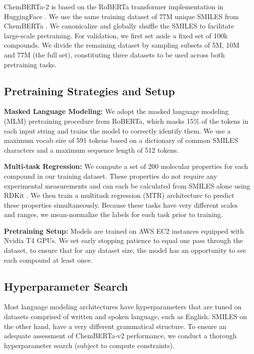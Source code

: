 \documentclass{article}
\begin{document}
ChemBERTa-2 is based on the RoBERTa \cite{roberta} transformer implementation in HuggingFace \cite{huggingface}. We use the same training dataset of 77M unique SMILES from ChemBERTa \cite{chithrananda2020chemberta}. We canonicalize and globally shuffle the SMILES to facilitate large-scale pretraining. For validation, we first set aside a fixed set of 100k compounds. We divide the remaining dataset by sampling subsets of 5M, 10M and 77M (the full set), constituting three datasets to be used across both pretraining tasks.



\subsection{Pretraining Strategies and Setup}

\textbf{Masked Language Modeling:} We adopt the masked language modeling (MLM) pretraining procedure from RoBERTa, which masks 15\% of the tokens in each input string and trains the model to correctly identify them. We use a maximum vocab size of 591 tokens based on a dictionary of common SMILES characters and a maximum sequence length of 512 tokens.

\textbf{Multi-task Regression:} We compute a set of 200 molecular properties for each compound in our training dataset. These properties do not require any experimental measurements and can each be calculated from SMILES alone using RDKit \cite{rdkit}. We then train a multitask regression (MTR) architecture to predict these properties simultaneously. Because these tasks have very different scales and ranges, we mean-normalize the labels for each task prior to training.

\textbf{Pretraining Setup:} Models are trained on AWS EC2 instances equipped with Nvidia T4 GPUs. We set early stopping patience to equal one pass through the dataset, to ensure that for any dataset size, the model has an opportunity to see each compound at least once. 

\subsection{Hyperparameter Search}

Most language modeling architectures have hyperparameters that are tuned on datasets comprised of written and spoken language, such as English. SMILES on the other hand, have a very different grammatical structure. To ensure an adequate assessment of ChemBERTa-v2 performance, we conduct a thorough hyperparameter search (subject to compute constraints).
\end{document}
